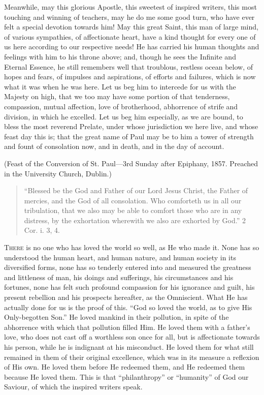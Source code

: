 Meanwhile, may this glorious Apostle, this sweetest of
inspired writers, this most touching and winning of
teachers, may he do me some good turn, who have ever felt
a special devotion towards him! May this great Saint,
this man of large mind, of various sympathies, of
affectionate heart, have a kind thought for every one of
us here according to our respective needs! He has carried
his human thoughts and feelings with him to his throne
above; and, though he sees the Infinite and Eternal
Essence, he still remembers well that troublous, restless
ocean below, of hopes and fears, of impulses and
aspirations, of efforts and failures, which is now what
it was when he was here. Let us beg him to intercede for
us with the Majesty on high, that we too may have some portion of that tenderness, compassion, mutual affection,
love of brotherhood, abhorrence of strife and division,
in which he excelled. Let us beg him especially, as we
are bound, to bless the most reverend Prelate, under
whose jurisdiction we here live, and whose feast day this
is; that the great name of Paul may be to him a tower of
strength and fount of consolation now, and in death, and
in the day of account.

(Feast of the Conversion of St. Paul—3rd Sunday
after Epiphany, 1857. Preached in the University Church,
Dublin.)


\begin{quote}

``Blessed be the God and Father of our Lord
Jesus Christ, the Father of mercies, and the God of
all consolation. Who comforteth us in all our
tribulation, that we also may be able to comfort
those who are in any distress, by the exhortation
wherewith we also are exhorted by God.'' 2 Cor.
i. 3, 4.

\end{quote}

T\textsc{here} is no one who has loved the world so well, as He
who made it. None has so understood the human heart, and
human nature, and human society in its diversified forms,
none has so tenderly entered into and measured the
greatness and littleness of man, his doings and
sufferings, his circumstances and his fortunes, none has
felt such profound compassion for his ignorance and
guilt, his present rebellion and his prospects hereafter,
as the Omniscient. What He has actually done for us is
the proof of this. ``God so loved the world, as to
give His Only-begotten Son.'' He loved mankind in
their pollution, in spite of the abhorrence with which
that pollution filled Him. He loved them with a father's
love, who does not cast off a worthless son once for all,
but is affectionate towards his person, while he is
indignant at his misconduct. He loved them for what still
remained in them of their original excellence, which was
in its measure a reflexion of His own. He loved them
before He redeemed them, and He redeemed them because He
loved them. This is that ``philanthropy'' or
``humanity'' of God our Saviour, of which the
inspired writers speak.

